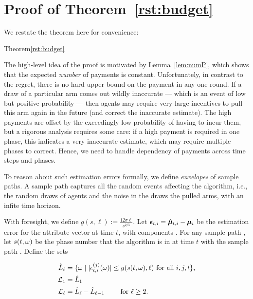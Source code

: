 \section{Proof of Theorem~\ref{rst:budget}}
\label{sec:payment-proof}

We restate the theorem here for convenience:

\begin{rtheorem}{Theorem}{\ref{rst:budget}}
\end{rtheorem}

The high-level idea of the proof is motivated by Lemma~\ref{lem:numP},
which shows that the expected \emph{number} of payments is constant.
Unfortunately, in contrast to the regret, there is no hard upper bound
on the payment in any one round.
If a draw of a particular arm comes out wildly inaccurate --- which is
an event of low but positive probability ---
then agents may require very large incentives to pull this arm again
in the future (and correct the inaccurate estimate).
The high payments are offset by the exceedingly low probability of
having to incur them, but a rigorous analysis requires some care:
if a high payment is required in one phase, this indicates a very
inaccurate estimate, which may require multiple phases to correct.
Hence, we need to handle dependency of payments across time steps and
phases.

To reason about such estimation errors formally, we define
\emph{envelopes} of sample paths.
A sample path \SP captures all the random events affecting the
algorithm, i.e., the random draws  of agents and the
noise \NoiseV[t] in the draws the pulled arms,
with an infite  time horizon.

With foresight, we define $g(s, \ell) := \frac{12 \sigma \ell}{s^{2/5}}$.
Let $\bm{\epsilon}_{t,i} = \bm{\hat{\mu}}_{t,i} - \bm{\mu}_{i}$ be the estimation
error for the attribute vector  at time $t$,
with components .
For any sample path \SP, let $s (t,\omega)$ be the phase number that the
algorithm is in at time $t$ with the sample path \SP.
Define the sets

\begin{align*}
\hat{L}_\ell
  & = \{ \omega \mid |\epsilon_{t,i}^{(j)}(\omega)| \leq g(s(t,\omega),\ell)
    \mbox{ for all } i,j,t \},\\
{\mathcal L}_{1} & = \hat{L}_1\\ 
{\mathcal L}_{\ell} & = \hat{L}_{\ell} - \hat{L}_{\ell-1}
  \qquad \mbox{ for } \ell \geq 2.
\end{align*}

